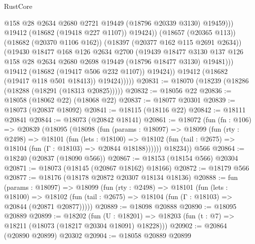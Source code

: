 \begin{lexlean}{RustCore}
\begin{coremodule}
                              @158
                              @28
                              @2634
                              @2680
                              @2721
                              @19449
                              (@18796 @20339 @3130)
                              @19459)))
                        @19412
                        (@18682 (@19418 @227 @1107))
                        @19424))
                    (@18657 (@20365 @113))
                    (@18682 (@20370 @1106 @162))
                    (@18397 (@20377 @162 @115 @2691 @2634))
                    (@19430
                      @18477
                      @168
                      @126
                      @2634
                      @2700
                      (@19439
                        @18477
                        @3130
                        @137
                        @126
                        @158
                        @28
                        @2634
                        @2680
                        @2698
                        @19449
                        (@18796 @18477 @3130)
                        @19481)))
                  @19412
                  (@18682 (@19417 @506 @232 @1107))
                  @19424))
              @19412
              (@18682 (@19417 @118 @501 @18413))
              @19424)))))
@20831 := @18070 (@18239 (@18286 (@18288 (@18291 (@18313 @20825)))))
@20832 := @18056 @22
@20836 := @18058 (@18062 @22) (@18068 @22)
@20837 := @18077 @20301
@20839 := @18073 (@20837 @18092)
@20841 := @18115 (@18116 @22)
@20842 := @18111 @20841
@20844 := @18073 (@20842 @18141)
@20861 := @18072
    (fun (fn : @106) =>
    @20839
      (@18095
        (@18098
          (fun (params : @18097) =>
          @18099
            (fun (rty : @2498) =>
            @18101
              (fun (lets : @18100) =>
              @18102 (fun (tail : @2675) => @18104 (fun (Γ : @18103) => @20844 @18188))))))
        @18234))
    @566
@20864 := @18240 (@20837 (@18090 @566))
@20867 := @18153 (@18154 @566) @20304
@20871 := @18073 (@18145 (@20867 @18162) @18166)
@20872 := @18179 @566
@20877 := @18176 (@18178 @20872 @20307 @18134 @18136)
@20888 := fun (params : @18097) =>
  @18099
    (fun (rty : @2498) =>
    @18101
      (fun (lets : @18100) =>
      @18102 (fun (tail : @2675) => @18104 (fun (Γ : @18103) => @20844 (@20871 @20877)))))
@20889 := @18098 @20888
@20890 := @18095 @20889
@20899 := @18202
    (fun (U : @18201) => @18203 (fun (t : @7) => @18211 (@18073 (@18217 @20304 @18091) @18228)))
@20902 := @20864 (@20890 @20899) @20302
@20904 := @18058 @20889 @20899

\end{coremodule}
\end{lexlean}
